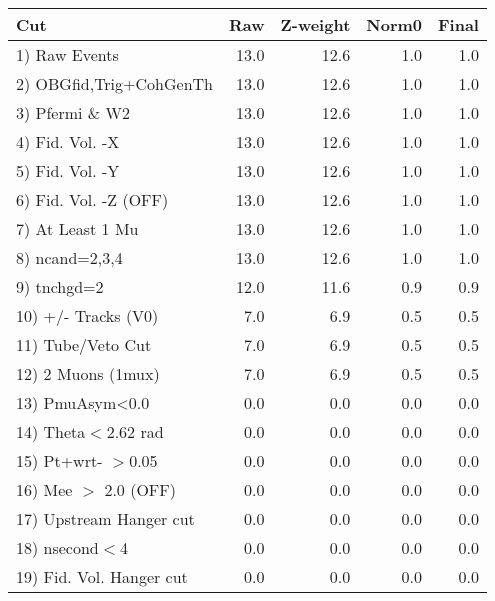  \begin{table}[h!]\centering
 \begin{tabular}{||l||r|r|r|r||}
 \hline
 \hline
 Cut & Raw & Z-weight & Norm0 & Final \\
 \hline
  1) Raw Events           &        13.0 &        12.6 &         1.0 &         1.0 \\
  2) OBGfid,Trig+CohGenTh &        13.0 &        12.6 &         1.0 &         1.0 \\
  3) Pfermi \& W2         &        13.0 &        12.6 &         1.0 &         1.0 \\
  4) Fid. Vol. -X         &        13.0 &        12.6 &         1.0 &         1.0 \\
  5) Fid. Vol. -Y         &        13.0 &        12.6 &         1.0 &         1.0 \\
  6) Fid. Vol. -Z (OFF)   &        13.0 &        12.6 &         1.0 &         1.0 \\
  7) At Least 1 Mu        &        13.0 &        12.6 &         1.0 &         1.0 \\
  8) ncand=2,3,4          &        13.0 &        12.6 &         1.0 &         1.0 \\
  9) tnchgd=2             &        12.0 &        11.6 &         0.9 &         0.9 \\
 10) +/- Tracks (V0)      &         7.0 &         6.9 &         0.5 &         0.5 \\
 11) Tube/Veto Cut        &         7.0 &         6.9 &         0.5 &         0.5 \\
 12) 2 Muons (1mux)       &         7.0 &         6.9 &         0.5 &         0.5 \\
 13) PmuAsym<0.0          &         0.0 &         0.0 &         0.0 &         0.0 \\
 14) Theta$<$2.62 rad     &         0.0 &         0.0 &         0.0 &         0.0 \\
 15) Pt+wrt- $>$0.05      &         0.0 &         0.0 &         0.0 &         0.0 \\
 16) Mee $>$ 2.0  (OFF)   &         0.0 &         0.0 &         0.0 &         0.0 \\
 17) Upstream Hanger cut  &         0.0 &         0.0 &         0.0 &         0.0 \\
 18) nsecond$<$4          &         0.0 &         0.0 &         0.0 &         0.0 \\
 19) Fid. Vol. Hanger cut &         0.0 &         0.0 &         0.0 &         0.0 \\

\end{tabular}
\end{table}

